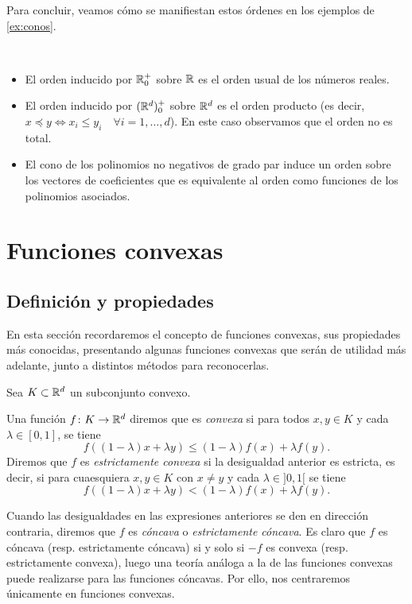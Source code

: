 Para concluir, veamos cómo se manifiestan estos órdenes en los ejemplos de \ref{ex:conos}.
\begin{example}~
    \begin{itemize}
        \item El orden inducido por $\mathbb{R}^+_0$ sobre $\mathbb{R}$ es el orden usual de los números reales.
        \item El orden inducido por $(\mathbb{R}^d)^+_0$ sobre $\mathbb{R}^d$ es el orden producto (es decir, $x \preceq y \iff x_i \le y_i \quad \forall i=1,\dots,d$). En este caso observamos que el orden no es total.
        \item El cono de los polinomios no negativos de grado par induce un orden sobre los vectores de coeficientes que es equivalente al orden como funciones de los polinomios asociados.
\end{itemize}
\end{example}

\section{Funciones convexas}

\subsection{Definición y propiedades}

En esta sección recordaremos el concepto de funciones convexas, sus propiedades más conocidas, presentando algunas funciones convexas que serán de utilidad más adelante, junto a distintos métodos para reconocerlas.

\begin{definition}
    Sea $K \subset \mathbb{R}^d$ un subconjunto convexo. 

    Una función $f \colon K \to \mathbb{R}^d$ diremos que es \emph{convexa} si para todos $x,y \in K$ y cada $\lambda \in [0,1]$, se tiene
    \[f((1-\lambda)x+\lambda y) \le (1-\lambda) f(x) + \lambda f(y). \]
    Diremos que $f$ es \emph{estrictamente convexa} si la desigualdad anterior es estricta, es decir, si para cuaesquiera $x,y \in K$ con $x\ne y$ y cada $\lambda \in ]0,1[$ se tiene
    \[f((1-\lambda)x+\lambda y) < (1-\lambda)f(x) + \lambda f(y). \]

    Cuando las desigualdades en las expresiones anteriores se den en dirección contraria, diremos que $f$ es \emph{cóncava} o \emph{estrictamente cóncava}. Es claro que $f$ es cóncava (resp. estrictamente cóncava) si y solo si $-f$ es convexa (resp. estrictamente convexa), luego una teoría análoga a la de las funciones convexas puede realizarse para las funciones cóncavas. Por ello, nos centraremos únicamente en funciones convexas.
\end{definition}

